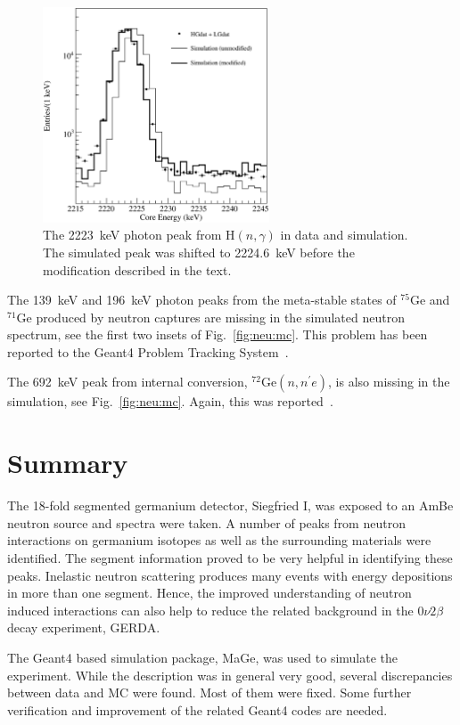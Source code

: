 \begin{figure}[tbhp]
  \centering
  \includegraphics[width=0.6\textwidth]{h2223}
  \caption{The 2223~keV photon peak from H$(n,\gamma)$ in data and     simulation. The simulated peak was shifted to 2224.6~keV before     the modification described in the text.}
  \label{fig:neu:h2223}
\end{figure}

The 139~keV and 196~keV photon peaks from the meta-stable states of
$^{75}$Ge and $^{71}$Ge produced by neutron captures are missing in
the simulated neutron spectrum, see the first two insets of
Fig.~\ref{fig:neu:mc}. This problem has been reported to the Geant4
Problem Tracking System~\cite{g4bug3}.

The 692~keV peak from internal conversion, $^{72}$Ge$(n,n^{\prime}e)$, is also missing in the simulation, see Fig.~\ref{fig:neu:mc}. Again, this was reported~\cite{g4bug4}.

\section{Summary}
\label{sec:neu:out}
The 18-fold segmented germanium detector, Siegfried I, was exposed to an AmBe neutron source and spectra were taken. A number of peaks from neutron interactions on germanium isotopes as well as the surrounding materials were identified. The segment information proved to be very helpful in identifying these peaks. Inelastic neutron scattering produces many events with energy depositions in more than one segment. Hence, the improved understanding of neutron induced interactions can also help to reduce the related background in the $0\nu2\beta$ decay experiment, GERDA.

The Geant4 based simulation package, MaGe, was used to simulate the experiment. While the description was in general very good, several discrepancies between data and MC were found. Most of them were fixed. Some further verification and improvement of the related Geant4 codes are needed.


